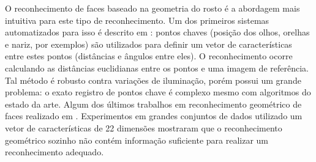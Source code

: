 O reconhecimento de faces baseado na geometria do rosto é a abordagem mais intuitiva para este tipo de reconhecimento. Um dos primeiros sistemas automatizados para isso é descrito em \cite{kanade1973picture}: pontos chaves (posição dos olhos, orelhas e nariz, por exemplos) são utilizados para definir um vetor de características entre estes pontos (distâncias e ângulos entre eles). O reconhecimento ocorre calculando as distâncias euclidianas entre os pontos e uma imagem de referência. Tal método é robusto contra variações de iluminação, porém possui um grande problema: o exato registro de pontos chave é complexo mesmo com algoritmos do estado da arte. Algum dos últimos trabalhos em reconhecimento geométrico de faces realizado em \cite{brunelli1992face}. Experimentos em grandes conjuntos de dados utilizado um vetor de características de 22 dimensões mostraram que o reconhecimento geométrico sozinho não contém informação suficiente para realizar um reconhecimento adequado.

